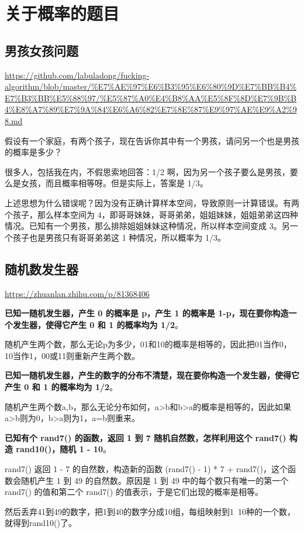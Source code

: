 \documentclass[12pt]{article}
\begin{document}
\section{关于概率的题目}
\subsection{男孩女孩问题}
\url{https://github.com/labuladong/fucking-algorithm/blob/master/%E7%AE%97%E6%B3%95%E6%80%9D%E7%BB%B4%E7%B3%BB%E5%88%97/%E5%87%A0%E4%B8%AA%E5%8F%8D%E7%9B%B4%E8%A7%89%E7%9A%84%E6%A6%82%E7%8E%87%E9%97%AE%E9%A2%98.md}

假设有一个家庭，有两个孩子，现在告诉你其中有一个男孩，请问另一个也是男孩的概率是多少？

很多人，包括我在内，不假思索地回答：1/2 啊，因为另一个孩子要么是男孩，要么是女孩，而且概率相等呀。但是实际上，答案是 1/3。

上述思想为什么错误呢？因为没有正确计算样本空间，导致原则一计算错误。有两个孩子，那么样本空间为 4，即哥哥妹妹，哥哥弟弟，姐姐妹妹，姐姐弟弟这四种情况。已知有一个男孩，那么排除姐姐妹妹这种情况，所以样本空间变成 3。另一个孩子也是男孩只有哥哥弟弟这 1 种情况，所以概率为 1/3。

\subsection{随机数发生器}
\url{https://zhuanlan.zhihu.com/p/81368406}

\textbf{已知一随机发生器，产生 0 的概率是 p，产生 1 的概率是 1-p，现在要你构造一个发生器，使得它产生 0 和 1 的概率均为 1/2}。

随机产生两个数，那么无论p为多少，01和10的概率是相等的，因此把01当作0，10当作1，00或11则重新产生两个数。

\textbf{已知一随机发生器，产生的数字的分布不清楚，现在要你构造一个发生器，使得它产生 0 和 1 的概率均为 1/2}。

随机产生两个数a,b，那么无论分布如何，a>b和b>a的概率是相等的，因此如果a>b则为0，b>a则为1，a=b则重来。

\textbf{已知有个 rand7() 的函数，返回 1 到 7 随机自然数，怎样利用这个 rand7() 构造 rand10()，随机 1 - 10}。

rand7() 返回 1 - 7 的自然数，构造新的函数 (rand7() - 1) * 7 + rand7()，这个函数会随机产生 1 到 49 的自然数。原因是 1 到 49 中的每个数只有唯一的第一个 rand7() 的值和第二个 rand7() 的值表示，于是它们出现的概率是相等。

然后丢弃41到49的数字，把1到40的数字分成10组，每组映射到1~10种的一个数，就得到rand10()了。
\end{document}
